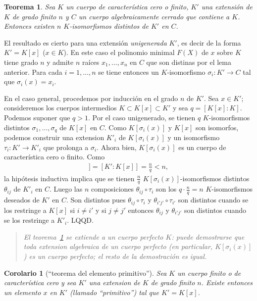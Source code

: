 \documentclass[bibtotoc,leqno,spanish]{amsbook}
\newcommand{\QED}{LQQD.}
\renewcommand{\to}[1][]{\xrightarrow{#1}}
\numberwithin{equation}{section}
\newenvironment{comm}%
	{\begin{quotation}\itshape}
	{\end{quotation}}
\theoremstyle{note}
\theoremstyle{note}
\newtheorem{theorem}{Teorema}
\newtheorem*{corollary*}{Corolario}
\theoremstyle{rem}
\numberwithin{theorem}{section}
\numberwithin{proposition}{section}
\numberwithin{definition}{section}
\numberwithin{lemma}{section}
\numberwithin{corollary}{section}
\numberwithin{example}{section}
\numberwithin{footnote}{section}%
\begin{document}
\begin{theorem}\label{teo2.4.1}
Sea $K$ un cuerpo de caracter\'istica cero o finito, $K'$ una extensi\'on de $K$ de grado finito $n$
y $C$ un cuerpo algebraicamente cerrado que contiene a $K$. Entonces existen $n$ $K$-isomorfismos distintos
de $K'$ en $C$.
\end{theorem}

El resultado es cierto para una extensi\'on {\em unigenerada} $K'$, es decir de la forma $K' = K[x]$
($x\in K$). En este caso el polinomio minimal $F(X)$ de $x$ sobre $K$ tiene grado $n$ y admite
$n$ ra\'ices $x_{1},\dots, x_{n}$ en $C$ que son distinas por el lema anterior. Para cada $i=1,\dots,n$ se
tiene entonces un $K$-isomorfismo $\sigma_{i}:K'\to C$ tal que $\sigma_{i}(x) = x_{i}$.

En el caso general, procedemos por inducci\'on en el grado $n$ de $K'$. Sea $x\in K'$; consideremos los cuerpos
intermedios $K\subset K[x]\subset K'$ y sea $q = [K[x]:K]$. Podemos suponer que $q > 1$. Por el caso unigenerado,
se tienen $q$ $K$-isomorfismos distintos $\sigma_{1},\dots,\sigma_{q}$ de $K[x]$ en $C$. Como
$K[\sigma_{i}(x)]$ y $K[x]$ son isomorfos, podemos construir una extension $K'_{i}$ de $K[\sigma_{i}(x)]$
y un isomorfismo $\tau_{i}:K'\to K'_{i}$ que prolonga a $\sigma_{i}$. Ahora bien, $K[\sigma_{i}(x)]$
es un cuerpo de caracter\'istica cero o finito. Como
\begin{gather*}
[K'_{i}:K[\sigma_{i}(x)]] = [K':K[x]] = \frac{n}{q} < n,
\end{gather*}
la hip\'otesis inductiva implica que se tienen $\frac{n}{q}$ $K[\sigma_{i}(x)]$-isomorfismos distintos
$\theta_{ij}$ de $K'_{i}$ en $C$. Luego las $n$ composiciones $\theta_{ij}\circ\tau_{i}$ son los
$q\cdot\frac{n}{q} = n$ $K$-isomorfismos deseados de $K'$ en $C$. Son distintos pues
$\theta_{ij}\circ\tau_{i}$ y $\theta_{i'j'}\circ\tau_{i'}$ son distintos cuando se los restringe a
$K[x]$ si $i\neq i'$ y si $j\neq j'$ entonces $\theta_{ij}$ y $\theta_{i'j'}$ son distintos cuando
se los restringe a $K'_{i}$. \QED

\begin{comm}
El teorema~\ref{teo2.4.1} se extiende a un cuerpo perfecto $K$: puede demostrarse que
toda extension algebraica de
un cuerpo perfecto (en particular, $K[\sigma_{i}(x)]$) es un cuerpo perfecto; el resto de
la demostraci\'on es igual.
\end{comm}

\begin{corollary*}[``teorema del elemento primitivo'']
Sea $K$ un cuerpo finito o de caracter\'istica cero y sea $K'$ una extension de $K$ de grado finito $n$.
Existe entonces un elemento $x$ en $K'$ (llamado ``primitivo'') tal que $K' = K[x]$.
\end{corollary*}
\end{document}
